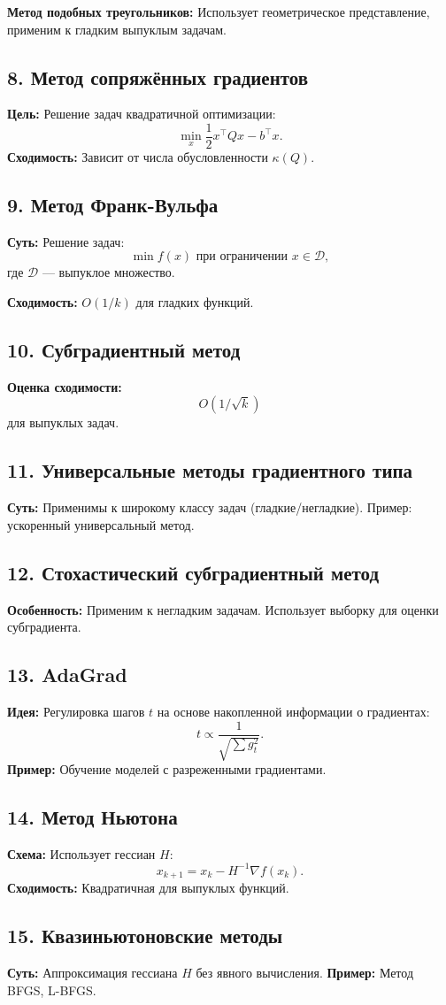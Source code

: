 \documentclass[a4paper,12pt]{article}
\begin{document}
\textbf{Метод подобных треугольников:} Использует геометрическое представление, применим к гладким выпуклым задачам.

\subsection*{8. Метод сопряжённых градиентов}
\textbf{Цель:} Решение задач квадратичной оптимизации:
\[
\min_x \frac{1}{2}x^\top Qx - b^\top x.
\]
\textbf{Сходимость:} Зависит от числа обусловленности \(\kappa(Q)\).

\subsection*{9. Метод Франк-Вульфа}
\textbf{Суть:} Решение задач:
\[
\min f(x) \text{ при ограничении } x \in \mathcal{D},
\]
где \(\mathcal{D}\) --- выпуклое множество.

\textbf{Сходимость:} \(O(1/k)\) для гладких функций.

\subsection*{10. Субградиентный метод}
\textbf{Оценка сходимости:}
\[
O(1/\sqrt{k})
\]
для выпуклых задач.

\subsection*{11. Универсальные методы градиентного типа}
\textbf{Суть:} Применимы к широкому классу задач (гладкие/негладкие). Пример: ускоренный универсальный метод.

\subsection*{12. Стохастический субградиентный метод}
\textbf{Особенность:} Применим к негладким задачам. Использует выборку для оценки субградиента.

\subsection*{13. AdaGrad}
\textbf{Идея:} Регулировка шагов \(t\) на основе накопленной информации о градиентах:
\[
t \propto \frac{1}{\sqrt{\sum g_t^2}}.
\]
\textbf{Пример:} Обучение моделей с разреженными градиентами.

\subsection*{14. Метод Ньютона}
\textbf{Схема:} Использует гессиан \(H\):
\[
x_{k+1} = x_k - H^{-1}\nabla f(x_k).
\]
\textbf{Сходимость:} Квадратичная для выпуклых функций.

\subsection*{15. Квазиньютоновские методы}
\textbf{Суть:} Аппроксимация гессиана \(H\) без явного вычисления. 
\textbf{Пример:} Метод BFGS, L-BFGS.
\end{document}
